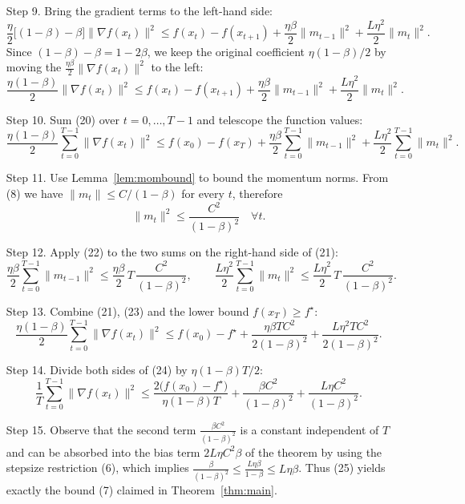 \documentclass{article}
\begin{document}
\begin{enumerate}
\item[Step 9.] Bring the gradient terms to the left-hand side:
\[
\frac{\eta}{2}\bigl[(1-\beta)-\beta\bigr]\|\nabla f(x_t)\|^2
\le f(x_t)-f(x_{t+1})
+\frac{\eta\beta}{2}\|m_{t-1}\|^2
+\frac{L\eta^2}{2}\|m_t\|^2 .
\tag{19}
\]
Since $(1-\beta)-\beta = 1-2\beta$, we keep the original coefficient
$\eta(1-\beta)/2$ by moving the $\frac{\eta\beta}{2}\|\nabla f(x_t)\|^2$
to the left:
\[
\frac{\eta(1-\beta)}{2}\|\nabla f(x_t)\|^2
\le f(x_t)-f(x_{t+1})
+\frac{\eta\beta}{2}\|m_{t-1}\|^2
+\frac{L\eta^2}{2}\|m_t\|^2 .
\tag{20}
\]

\item[Step 10.] Sum (20) over $t=0,\dots,T-1$ and telescope the
function values:
\[
\frac{\eta(1-\beta)}{2}\sum_{t=0}^{T-1}\|\nabla f(x_t)\|^2
\le f(x_0)-f(x_T)
+\frac{\eta\beta}{2}\sum_{t=0}^{T-1}\|m_{t-1}\|^2
+\frac{L\eta^2}{2}\sum_{t=0}^{T-1}\|m_t\|^2 .
\tag{21}
\]

\item[Step 11.] Use Lemma~\ref{lem:mombound} to bound the momentum norms.
From (8) we have $\|m_t\|\le C/(1-\beta)$ for every $t$, therefore
\[
\|m_t\|^2\le \frac{C^2}{(1-\beta)^2}\quad\forall t .
\tag{22}
\]

\item[Step 12.] Apply (22) to the two sums on the right-hand side of (21):
\[
\frac{\eta\beta}{2}\sum_{t=0}^{T-1}\|m_{t-1}\|^2
\le \frac{\eta\beta}{2}\,T\,\frac{C^2}{(1-\beta)^2},
\qquad
\frac{L\eta^2}{2}\sum_{t=0}^{T-1}\|m_t\|^2
\le \frac{L\eta^2}{2}\,T\,\frac{C^2}{(1-\beta)^2}.
\tag{23}
\]

\item[Step 13.] Combine (21), (23) and the lower bound $f(x_T)\ge f^\star$:
\[
\frac{\eta(1-\beta)}{2}\sum_{t=0}^{T-1}\|\nabla f(x_t)\|^2
\le f(x_0)-f^\star
+\frac{\eta\beta T C^2}{2(1-\beta)^2}
+\frac{L\eta^2 T C^2}{2(1-\beta)^2}.
\tag{24}
\]

\item[Step 14.] Divide both sides of (24) by $\eta(1-\beta)T/2$:
\[
\frac{1}{T}\sum_{t=0}^{T-1}\|\nabla f(x_t)\|^2
\le
\frac{2\bigl(f(x_0)-f^\star\bigr)}{\eta(1-\beta)T}
+\frac{\beta C^2}{(1-\beta)^2}
+\frac{L\eta C^2}{(1-\beta)^2}.
\tag{25}
\]

\item[Step 15.] Observe that the second term $\frac{\beta C^2}{(1-\beta)^2}$
is a constant independent of $T$ and can be absorbed into the
bias term $2L\eta C^2\beta$ of the theorem by using the stepsize
restriction (6), which implies $\frac{\beta}{(1-\beta)^2}\le
\frac{L\eta\beta}{1-\beta}\le L\eta\beta$.
Thus (25) yields exactly the bound (7) claimed in Theorem~\ref{thm:main}.
\end{enumerate}
\end{document}
